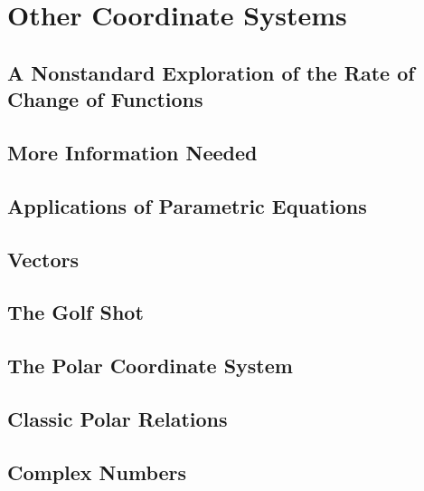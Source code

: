 \documentclass[../precalc.tex]{subfiles}
\begin{document}
\chapter{Other Coordinate Systems}
\section{A Nonstandard Exploration of the Rate of Change of Functions}
\section{More Information Needed}
\section{Applications of Parametric Equations}
\section{Vectors}
\section{The Golf Shot}
\section{The Polar Coordinate System}
\section{Classic Polar Relations}
\section{Complex Numbers}
\end{document}
